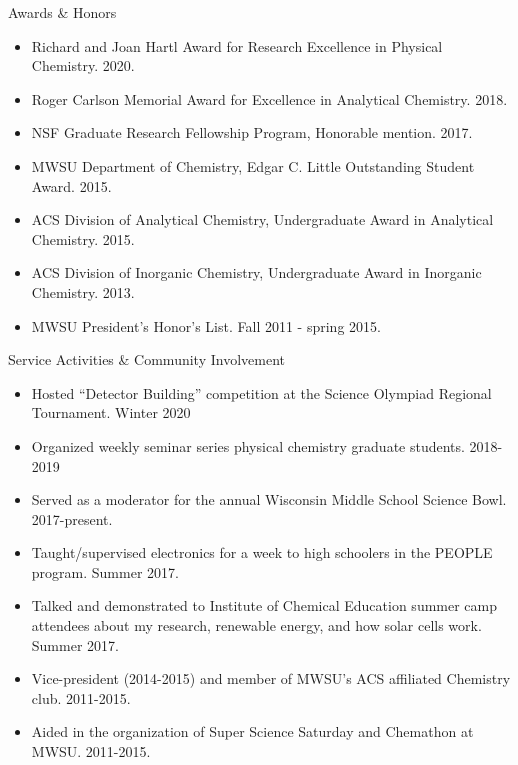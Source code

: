 \documentclass{resume} %
\begin{document}
\begin{rSection}{Awards \& Honors}

\begin{itemize}[leftmargin = 0 pt]
	\item Richard and Joan Hartl Award for Research Excellence in Physical Chemistry. 2020.
	\item Roger Carlson Memorial Award for Excellence in Analytical Chemistry. 2018.
	\item NSF Graduate Research Fellowship Program, Honorable mention. 2017.
	\item MWSU Department of Chemistry, Edgar C. Little Outstanding Student Award. 2015.
	\item ACS Division of Analytical Chemistry, Undergraduate Award in Analytical Chemistry. 2015. 
	\item ACS Division of Inorganic Chemistry, Undergraduate Award in Inorganic Chemistry. 2013.
	\item MWSU President’s Honor’s List. Fall 2011 - spring 2015.
\end{itemize}
\end{rSection}



\begin{rSection}{Service Activities \& Community Involvement}

\begin{itemize}[leftmargin = 0 pt]
	\item Hosted ``Detector Building'' competition at the Science Olympiad Regional Tournament. Winter 2020	
	\item Organized weekly seminar series physical chemistry graduate students. 2018-2019
	\item Served as a moderator for the annual Wisconsin Middle School Science Bowl. 2017-present.
	\item Taught/supervised electronics for a week to high schoolers in the PEOPLE program. Summer 2017.
	\item Talked and demonstrated to Institute of Chemical Education summer camp attendees about my research, renewable energy, and how solar cells work. Summer 2017.  
	\item Vice-president (2014-2015) and member of MWSU's ACS affiliated Chemistry club. 2011-2015.
	\item Aided in the organization of Super Science Saturday and Chemathon at MWSU. 2011-2015.	
\end{itemize}
\end{rSection}
\end{document}
